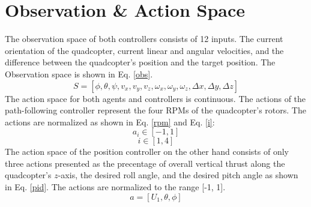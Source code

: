     \section{Observation \& Action Space}
    The observation space of both controllers consists of 12 inputs. The current orientation of the quadcopter, current linear and angular velocities, and the difference between the quadcopter's position and the target position. The Observation space is shown in Eq. \ref{obs}.
    \begin{equation}
        S = [\phi, \theta, \psi, v_{\textit{x}}, v_{\textit{y}}, v_{\textit{z}}, \omega_{\textit{x}}, \omega_{\textit{y}}, \omega_{\textit{z}},\Delta x, \Delta y, \Delta z]
        \label{obs}
    \end{equation}
    The action space for both agents and controllers is continuous. The actions of the path-following controller represent the four RPMs of the quadcopter’s rotors. The actions are normalized as shown in Eq. \ref{rpm} and Eq. \ref{i}:
    \begin{equation}
        a_{i} \in [-1, 1]
        \label{rpm}
    \end{equation} 
    \begin{equation}
        i \in [1, 4]
        \label{i}
    \end{equation}
    The action space of the position controller on the other hand consists of only three actions presented as the precentage of overall vertical thrust along the quadcopter's $z$-axis, the desired roll angle, and the desired pitch angle as shown in Eq. \ref{pid}. The actions are normalized to the range [-1, 1].
        \begin{equation}
        a = [U_{1}, \theta, \phi]
        \label{pid}
    \end{equation} \clearpage
